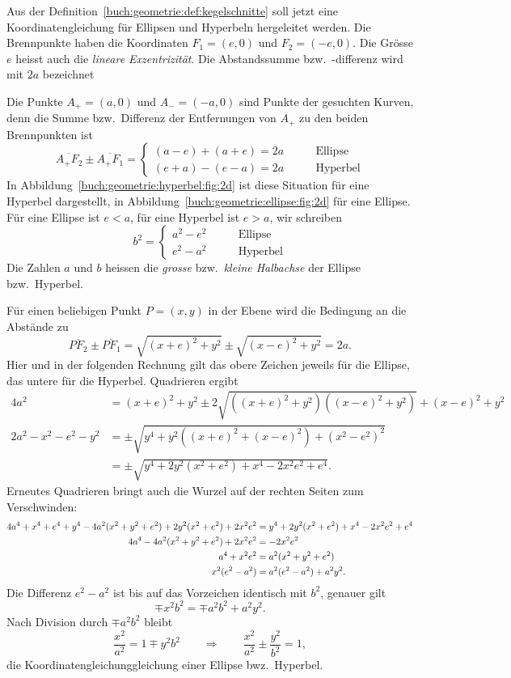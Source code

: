 Aus der Definition~\ref{buch:geometrie:def:kegelschnitte} soll jetzt
eine Koordinatengleichung für Ellipsen und Hyperbeln hergeleitet werden.
Die Brennpunkte haben die Koordinaten $F_1=(e,0)$ und $F_2=(-e,0)$.
Die Grösse $e$ heisst auch die {\em lineare Exzentrizität}.
Die Abstandssumme bzw.~-differenz wird mit $2a$ bezeichnet

Die Punkte $A_+=(a,0)$ und $A_-=(-a,0)$ sind Punkte der gesuchten
Kurven,
denn die Summe bzw.~Differenz der Entfernungen von $A_+$ zu den beiden
Brennpunkten ist
\[
\overline{A_+F_2}
\pm
\overline{A_+F_1}
=
\begin{cases}
(a-e)+(a+e) = 2a
&\qquad\text{Ellipse}
\\
(e+a)-(e-a) = 2a
&\qquad\text{Hyperbel}
\end{cases}
\]
In Abbildung~\ref{buch:geometrie:hyperbel:fig:2d} ist diese Situation
für eine Hyperbel dargestellt, in 
Abbildung~\ref{buch:geometrie:ellipse:fig:2d} für eine Ellipse.
Für eine Ellipse ist $e<a$, für eine Hyperbel ist $e>a$, wir schreiben
\[
b^2
=
\begin{cases}
a^2-e^2&\qquad\text{Ellipse} \\
e^2-a^2&\qquad\text{Hyperbel}
\end{cases}
\]
Die Zahlen $a$ und $b$ heissen die {\em grosse} bzw.~{\em kleine Halbachse}
der Ellipse bzw.~Hyperbel.

Für einen beliebigen Punkt $P=(x,y)$ in der Ebene wird die Bedingung
an die Abstände zu
\[
\overline{PF_2}
\pm
\overline{PF_1}
=
\sqrt{(x+e)^2+y^2}
\pm
\sqrt{(x-e)^2+y^2}
=
2a.
\]
Hier und in der folgenden Rechnung gilt das obere Zeichen jeweils
für die Ellipse, das untere für die Hyperbel.
Quadrieren ergibt
\begin{align*}
4a^2
&=
(x+e)^2+y^2
\pm
2\sqrt{
((x+e)^2+y^2)
((x-e)^2+y^2)
}
+
(x-e)^2+y^2
\\
2a^2-x^2-e^2-y^2
&=
\pm\sqrt{
y^4 + y^2((x+e)^2 + (x-e)^2) +(x^2-e^2)^2
}
\\
&=
\pm\sqrt{y^4 + 2y^2 ( x^2+e^2) +x^4 - 2x^2e^2 + e^4}.
\end{align*}
Erneutes Quadrieren bringt auch die Wurzel auf der rechten Seiten
zum Verschwinden:
\begin{align}
4a^4 + x^4 + e^4 + y^4
-4a^2(x^2+y^2+e^2)
+2y^2(x^2+e^2)+2x^2e^2
&=
y^4+2y^2(x^2 +e^2) + x^4 -2x^2e^2+e^4
\notag
\\
4a^4
-4a^2(x^2+y^2+e^2)
+2x^2e^2
&=
-2x^2e^2
\notag
\\
a^4+x^2e^2&=a^2(x^2+y^2+e^2)
\notag
\\
x^2(e^2-a^2)&=a^2(e^2-a^2) + a^2y^2.
\notag
\end{align}
Die Differenz $e^2-a^2$ ist bis auf das Vorzeichen identisch mit $b^2$,
genauer gilt
\begin{equation*}
\mp x^2b^2 = \mp a^2b^2 + a^2y^2.
\end{equation*}
Nach Division durch $\mp a^2b^2$ bleibt
\begin{equation}
\frac{x^2}{a^2} = 1 \mp{y^2}{b^2}
\qquad\Rightarrow\qquad
\frac{x^2}{a^2} \pm \frac{y^2}{b^2} = 1,
\label{buch:geometrie:hyperbel:gleichung}
\end{equation}
die Koordinatengleichunggleichung einer Ellipse bwz.~Hyperbel.


